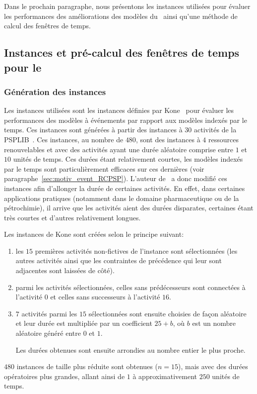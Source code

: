 Dans le prochain paragraphe, nous présentons les instances utilisées
pour évaluer les performances des améliorations des modèles du
\RCPSP~ainsi qu'une méthode de calcul des fenêtres de temps.
  
\subsection{Instances et pré-calcul des fenêtres de temps pour le
  \RCPSP}
\label{sec:instances_RCPSP}
\subsubsection{Génération des instances}
Les instances utilisées sont les instances définies par
Kone~\cite{theseOumar} pour évaluer les performances des modèles à
événements par rapport aux modèles indexés par le temps. Ces instances
sont générées à partir des instances à $30$ activités de la
PSPLIB~\cite{PSPLIB}. Ces instances, au nombre de $480$, sont des
instances à $4$ ressources renouvelables et avec des activités ayant
une durée aléatoire comprise entre $1$ et $10$ unités de temps. Ces
durées étant relativement courtes, les modèles indexés par le temps
sont particulièrement efficaces sur ces dernières (voir
paragraphe~\ref{sec:motiv_event_RCPSP}). L'auteur de~\cite{theseOumar}
a donc modifié ces instances afin d'allonger la durée de certaines 
activités. En effet, dans certaines applications pratiques (notamment
dans le domaine pharmaceutique ou de la pétrochimie), il arrive que
les activités aient des durées disparates, certaines étant très
courtes et d'autres relativement longues.

Les instances de Kone sont créées selon le principe suivant: 
\begin{enumerate}
\item les $15$ premières activités non-fictives de l’instance sont
  sélectionnées (les autres activités ainsi que les contraintes de
  précédence qui leur sont adjacentes sont laissées de côté).
\item parmi les activités sélectionnées, celles sans prédécesseurs
  sont connectées à l’activité 0 et celles sans successeurs à l’activité
  $16$.
\item  $7$ activités parmi les $15$ sélectionnées sont ensuite
  choisies de façon aléatoire et leur durée est multipliée par un
  coefficient $25+b$, où $b$ est un nombre aléatoire généré entre $0$
  et  $1$.

  Les durées obtenues sont ensuite arrondies au nombre entier le plus
  proche. 
\end{enumerate}
$480$ instances de taille plus réduite sont obtenues ($n=15$), mais
avec des durées opératoires plus grandes, allant ainsi de $1$ à
approximativement $250$ unités de temps. 

